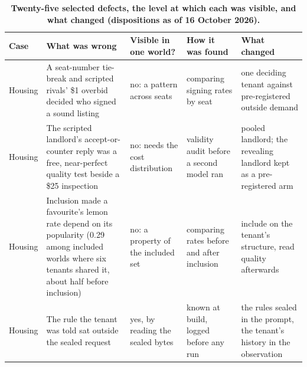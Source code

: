 \renewcommand{\thetable}{F.4}
\begin{longtable}[]{@{}
  >{\raggedright\arraybackslash}p{}
  >{\raggedright\arraybackslash}p{}
  >{\raggedright\arraybackslash}p{}
  >{\raggedright\arraybackslash}p{}
  >{\raggedright\arraybackslash}p{}@{}}
\caption{\textbf{Twenty-five selected defects, the level at which each was visible, and what changed (dispositions as of 16 October 2026).}}\label{tab:F.4}\tabularnewline
\toprule\noalign{}
\begin{minipage}[b]{\linewidth}\raggedright
Case
\end{minipage} & \begin{minipage}[b]{\linewidth}\raggedright
What was wrong
\end{minipage} & \begin{minipage}[b]{\linewidth}\raggedright
Visible in one world?
\end{minipage} & \begin{minipage}[b]{\linewidth}\raggedright
How it was found
\end{minipage} & \begin{minipage}[b]{\linewidth}\raggedright
What changed
\end{minipage} \\
\midrule\noalign{}
\endhead
\bottomrule\noalign{}
\endlastfoot
Housing & A seat-number tie-break and scripted rivals' \$1 overbid decided who signed a sound listing & no: a pattern across seats & comparing signing rates by seat & one deciding tenant against pre-registered outside demand \\
Housing & The scripted landlord's accept-or-counter reply was a free, near-perfect quality test beside a \$25 inspection & no: needs the cost distribution & validity audit before a second model ran & pooled landlord; the revealing landlord kept as a pre-registered arm \\
Housing & Inclusion made a favourite's lemon rate depend on its popularity (0.29 among included worlds where six tenants shared it, about half before inclusion) & no: a property of the included set & comparing rates before and after inclusion & include on the tenant's structure, read quality afterwards \\
Housing & The rule the tenant was told sat outside the sealed request & yes, by reading the sealed bytes & known at build, logged before any run & the rules sealed in the prompt, the tenant's history in the observation \\

\end{longtable}
